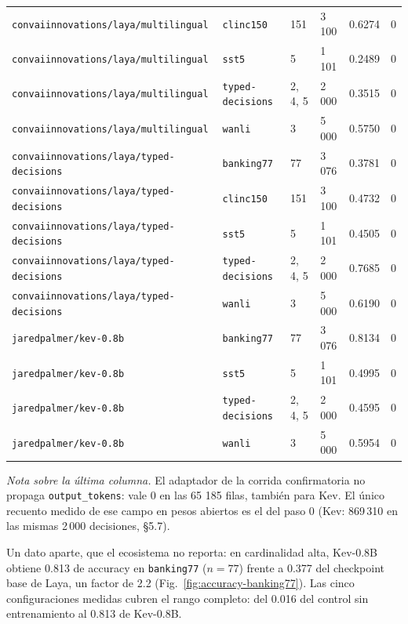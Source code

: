 \begin{table}[t]
{{\begin{tabular}{p{}p{}lll l}
\texttt{convaiinnovations/\allowbreak laya/\allowbreak multilingual} & \texttt{clinc150} & 151 & 3\,100 & 0.6274 & 0 \\
\texttt{convaiinnovations/\allowbreak laya/\allowbreak multilingual} & \texttt{sst5} & 5 & 1\,101 & 0.2489 & 0 \\
\texttt{convaiinnovations/\allowbreak laya/\allowbreak multilingual} & \texttt{typed-\allowbreak decisions} & 2, 4, 5 & 2\,000 & 0.3515 & 0 \\
\texttt{convaiinnovations/\allowbreak laya/\allowbreak multilingual} & \texttt{wanli} & 3 & 5\,000 & 0.5750 & 0 \\
\texttt{convaiinnovations/\allowbreak laya/\allowbreak typed-decisions} & \texttt{banking77} & 77 & 3\,076 & 0.3781 & 0 \\
\texttt{convaiinnovations/\allowbreak laya/\allowbreak typed-decisions} & \texttt{clinc150} & 151 & 3\,100 & 0.4732 & 0 \\
\texttt{convaiinnovations/\allowbreak laya/\allowbreak typed-decisions} & \texttt{sst5} & 5 & 1\,101 & 0.4505 & 0 \\
\texttt{convaiinnovations/\allowbreak laya/\allowbreak typed-decisions} & \texttt{typed-\allowbreak decisions} & 2, 4, 5 & 2\,000 & 0.7685 & 0 \\
\texttt{convaiinnovations/\allowbreak laya/\allowbreak typed-decisions} & \texttt{wanli} & 3 & 5\,000 & 0.6190 & 0 \\
\texttt{jaredpalmer/\allowbreak kev-0.8b} & \texttt{banking77} & 77 & 3\,076 & 0.8134 & 0 \\
\texttt{jaredpalmer/\allowbreak kev-0.8b} & \texttt{sst5} & 5 & 1\,101 & 0.4995 & 0 \\
\texttt{jaredpalmer/\allowbreak kev-0.8b} & \texttt{typed-\allowbreak decisions} & 2, 4, 5 & 2\,000 & 0.4595 & 0 \\
\texttt{jaredpalmer/\allowbreak kev-0.8b} & \texttt{wanli} & 3 & 5\,000 & 0.5954 & 0 \\
\bottomrule
\end{tabular}}}
\par\vspace{2pt}
{\footnotesize\emph{Nota sobre la última columna.} El adaptador de la corrida confirmatoria no propaga
\texttt{output\_tokens}: vale 0 en las 65 185 filas, también para Kev. El único recuento medido de ese campo en
pesos abiertos es el del paso 0 (Kev: 869\,310 en las mismas 2\,000 decisiones, §5.7).}
\end{table}

Un dato aparte, que el ecosistema no reporta: en cardinalidad alta, Kev-0.8B obtiene 0.813 de accuracy en
\texttt{banking77} ($n = 77$) frente a 0.377 del checkpoint base de Laya, un factor de 2.2
(Fig.~\ref{fig:accuracy-banking77}). Las cinco configuraciones medidas cubren el rango completo: del 0.016 del
control sin entrenamiento al 0.813 de Kev-0.8B.

